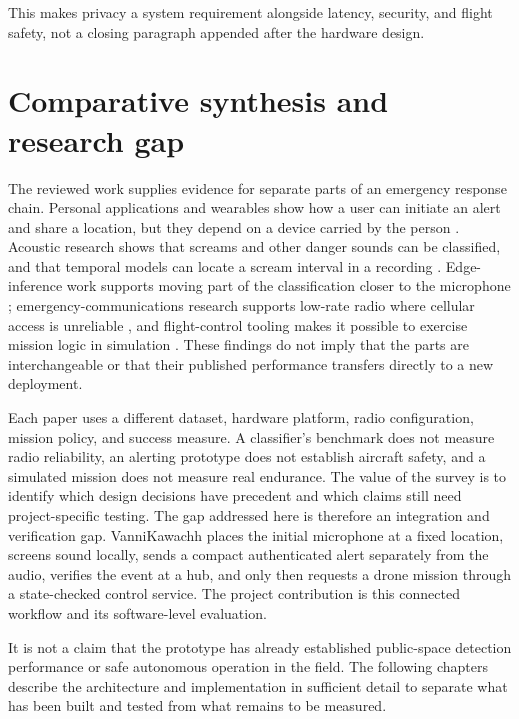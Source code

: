 \documentclass[12pt,a4paper]{report}
\begin{document}
This makes privacy a system requirement alongside latency, security, and flight safety, not a closing paragraph appended after the hardware design.

\section{Comparative synthesis and research gap}

The reviewed work supplies evidence for separate parts of an emergency response chain. Personal applications and wearables show how a user can initiate an alert and share a location, but they depend on a device carried by the person \cite{pavithra,bharathi,snehith,hadkar,uganya,potturi}. Acoustic research shows that screams and other danger sounds can be classified, and that temporal models can locate a scream interval in a recording \cite{kimwindow,kimscream,sharma,srimathi,fime}. Edge-inference work supports moving part of the classification closer to the microphone \cite{tflm,ciaburro}; emergency-communications research supports low-rate radio where cellular access is unreliable \cite{sciullo,lorawan}, and flight-control tooling makes it possible to exercise mission logic in simulation \cite{ardupilot,dronekitsitl}. These findings do not imply that the parts are interchangeable or that their published performance transfers directly to a new deployment.

Each paper uses a different dataset, hardware platform, radio configuration, mission policy, and success measure. A classifier's benchmark does not measure radio reliability, an alerting prototype does not establish aircraft safety, and a simulated mission does not measure real endurance. The value of the survey is to identify which design decisions have precedent and which claims still need project-specific testing. The gap addressed here is therefore an integration and verification gap. VanniKawachh places the initial microphone at a fixed location, screens sound locally, sends a compact authenticated alert separately from the audio, verifies the event at a hub, and only then requests a drone mission through a state-checked control service. The project contribution is this connected workflow and its software-level evaluation.

It is not a claim that the prototype has already established public-space detection performance or safe autonomous operation in the field. The following chapters describe the architecture and implementation in sufficient detail to separate what has been built and tested from what remains to be measured.
\end{document}
